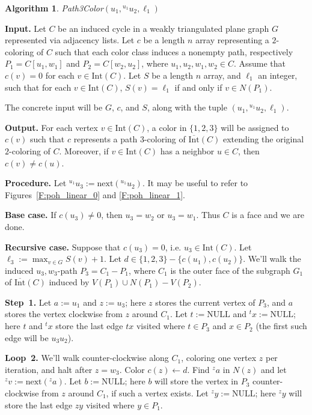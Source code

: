 \documentclass[12pt,letterpaper]{article}
\newcommand{\adj}[2]{{}^{#1}{#2}}
\newcommand{\nxt}{\text{next}}
\newcommand{\graphinto}{\text{Int}}
\newcommand{\graphintc}{\overline{\text{Int}}}
\theoremstyle{plain}
\theoremstyle{definition}
\theoremstyle{break}
\newtheorem{algorithm}[lemma]{Algorithm}     %
\begin{document}
\begin{algorithm}\label{A:poh_linear} \emph{Path3Color}$(u_1, \adj{{u_1}}{u_2}, \ell_1)$%

\textbf{Input.} Let $C$ be an induced cycle
in a weakly triangulated plane
graph $G$ represented via adjacency lists.
Let $c$ be a length $n$ array
representing a $2$-coloring of $C$ such
that each color class induces a nonempty path,
respectively $P_1=C[u_1,w_1]$ and
$P_2=C[w_2,u_2]$, where $u_1,u_2,w_1,w_2\in C$. Assume that $c(v)=0$
for each $v\in\graphinto(C)$.
Let $S$ be a length $n$ array, and $\ell_1$ an integer,
such that for each $v\in\graphinto(C)$, $S(v)=\ell_1$ if and only if
$v\in N(P_1)$.

The concrete input will be $G$, $c$, and $S$,
along with the tuple $(u_1, \adj{{u_1}}{u_2}, \ell_1)$.

\textbf{Output.} For each vertex $v\in\graphinto(C)$, a color in
$\{1,2,3\}$ will be
assigned to $c(v)$ such that $c$ represents a path $3$-coloring of
$\graphintc(C)$ extending the original $2$-coloring of $C$.
Moreover, if $v\in \graphinto(C)$ has a neighbor $u\in C$,
then $c(v)\ne c(u)$.

\textbf{Procedure.} Let $\adj{u_1}{u_3}:=\nxt(\adj{u_1}{u_2})$.
It may be useful to refer to Figures~\ref{F:poh_linear_0}
and \ref{F:poh_linear_1}.

\textbf{Base case.}
If $c(u_3)\ne 0$, then
$u_3=w_2$ or $u_3=w_1$. Thus $C$ is a face and we are done. 

\textbf{Recursive case.}
Suppose that $c(u_3)=0$, i.e. $u_3\in\graphinto(C)$.
Let $\ell_3:=\max_{v\in G}S(v)+1$.
Let $d\in \{1,2,3\}-\{c(u_1),c(u_2)\}$.
We'll walk the induced $u_3,w_3$-path $P_3=C_1-P_1$,
where $C_1$ is the outer face of the subgraph $G_1$
of $\graphintc(C)$
induced by $V(P_1)\cup N(P_1)-V(P_2)$.

\textbf{Step~1.}
Let $a:=u_1$ and $z:= u_3$; here $z$ stores the current
vertex of $P_3$, and $a$ stores the vertex
clockwise from $z$ around $C_1$.
Let $t:=\text{NULL}$ and $\adj{t}{x}:=\text{NULL}$;
here $t$ and $\adj{t}{x}$ store the last edge $tx$ visited
where $t\in P_3$ and $x\in P_2$
(the first such edge will be $u_3u_2$).

\textbf{Loop~2.} We'll walk counter-clockwise
along $C_1$, coloring one vertex $z$ per iteration, and
halt after $z=w_3$.
Color $c(z)\leftarrow d$.
Find $\adj{z}{a}$ in $N(z)$ and let
$\adj{z}{v}:= \nxt(\adj{z}{a})$.
Let $b:=\text{NULL}$; here
$b$ will store the vertex in $P_3$
counter-clockwise from $z$ around $C_1$, if such a vertex
exists.
Let $\adj{z}{y}:=\text{NULL}$; here
$\adj{z}{y}$ will store the last edge $zy$ visited
where $y\in P_1$.


\end{algorithm}
\end{document}
